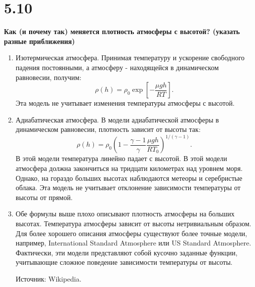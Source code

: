 \documentclass[a4paper,14pt]{article}
\begin{document}
\section*{5.10}

\begin{center}
	\LARGE{\textbf{Как (и почему так) меняется плотность атмосферы с высотой? (указать разные приближения)}}\\
\end{center}

\begin{enumerate}
    \item Изотермическая атмосфера.
    Принимая температуру и ускорение свободного падения постоянными, а атмосферу - находящейся в динамическом равновесии, получим:
    $$\rho (h) = \rho_0 \exp\left[-\frac{\mu g h}{RT}\right].$$
    Эта модель не учитывает изменения температуры атмосферы с высотой.
    
    \item Адиабатическая атмосфера.
    В модели адиабатической атмосферы в динамическом равновесии, плотность зависит от высоты так:
    $$\rho (h) = \rho_0 \left(1 - \frac{\gamma - 1}{\gamma} \frac{\mu g h}{R T_0}\right)^{1/(\gamma - 1)}.$$
    В этой модели температура линейно падает с высотой. В этой модели атмосфера должна закончиться на тридцати километрах над уровнем моря. Однако, на гораздо больших высотах наблюдаются метеоры и серебристые облака. Эта модель не учитывает отклонение зависимости температуры от высоты от прямой.
    
    \item Обе формулы выше плохо описывают плотность атмосферы на больших высотах. Температура атмосферы зависит от высоты нетривиальным образом. Для более хорошего описания атмосферы существуют более точные модели, например, International Standard Atmosphere или US Standard Atmosphere. Фактически, эти модели представляют собой кусочно заданные функции, учитывающие сложное поведение зависимости температуры от высоты.
    
    Источник: Wikipedia.
\end{enumerate}
\end{document}
